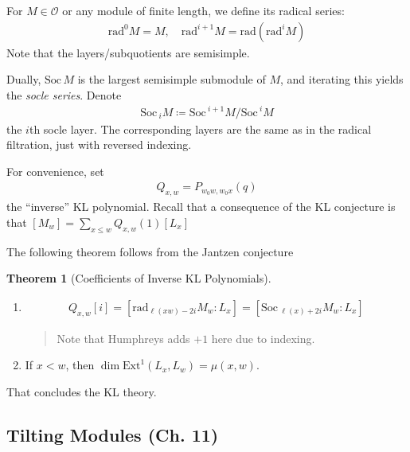 \documentclass[11pt]{scrartcl}
\theoremstyle{definition}
\theoremstyle{theorem}
\newtheorem{theorem}{Theorem}[section]
\theoremstyle{proof}
\theoremstyle{definition}
\theoremstyle{break}
\theoremstyle{problem}
\newcommand{\ext}[0]{\text{Ext}}
\newcommand{\definedas}[0]{\coloneqq}
\newcommand{\OO}[0]{{\mathcal{O}}}
\newcommand{\soc}[0]{\mathrm{Soc}\,}
\newcommand{\rad}[0]{{\mathrm{rad}}}
\begin{document}
For \(M\in \OO\) or any module of finite length, we define its radical
series:
\begin{align*}\rad^0 M = M,\quad \rad^{i+1} M = \rad(\rad^i M)\end{align*}
Note that the layers/subquotients are semisimple.

Dually, \(\soc M\) is the largest semisimple submodule of \(M\), and
iterating this yields the \emph{socle series}. Denote
\begin{align*}\soc_i M \definedas \soc^{i+1} M / \soc^i M\end{align*}
the \(i\)th socle layer. The corresponding layers are the same as in the
radical filtration, just with reversed indexing.

For convenience, set
\begin{align*}Q_{x, w} = P_{w_0 w, w_0 x}(q)\end{align*} the ``inverse''
KL polynomial. Recall that a consequence of the KL conjecture is that
\([M_w] = \sum_{x\leq w} Q_{x, w}(1) [L_x]\)

The following theorem follows from the Jantzen conjecture

\begin{theorem}[Coefficients of Inverse KL Polynomials]

\hfill

\begin{enumerate}
\def\labelenumi{\alph{enumi}.}
\item

  \begin{align*}Q_{x, w}[i] = [ \rad_{\ell(xw) - 2i} M_w : L_x] = [\soc_{\ell(x) + 2i} M_w: L_x]\end{align*}

  \begin{quote}
  Note that Humphreys adds \(+1\) here due to indexing.
  \end{quote}
\item
  If \(x < w\), then \(\dim \ext^1 (L_x, L_w) = \mu(x, w)\).
\end{enumerate}

\end{theorem}

That concludes the KL theory.

\hypertarget{tilting-modules-ch.-11}{%
\subsection{Tilting Modules (Ch. 11)}\label{tilting-modules-ch.-11}}
\end{document}
